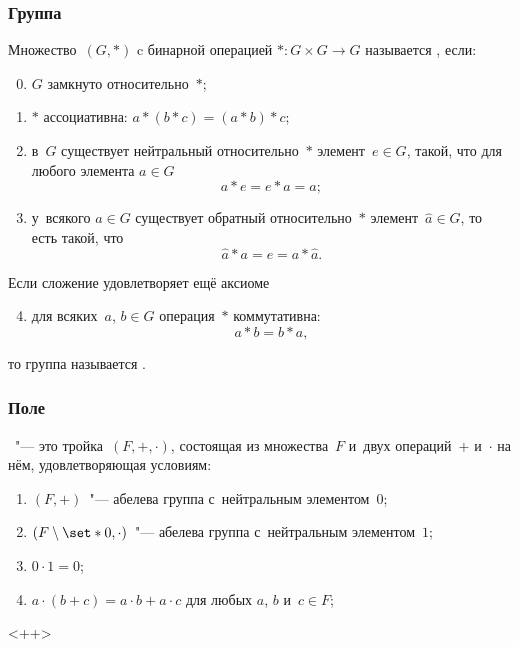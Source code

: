 \subsubsection{Группа}
\begin{definition}
	Множество~$(G, *)$ c бинарной операцией $* \colon G \times G \to G$ называется , если:
	\begin{enumerate}[1)]
		\setcounter{enumi}{-1}
		\item $G$ замкнуто относительно~$*$;
		\item $*$ ассоциативна: $a * (b * c) = (a * b) * c$;
		\item в~$G$ существует нейтральный относительно~$*$ элемент~$e \in G$, такой, что для любого элемента $a \in G$
			\[
				a * e = e * a = a
				;
			\]
		\item у~всякого $a \in G$ существует обратный относительно~$*$ элемент~$\hat{a} \in G$, то есть такой, что
			\[
				\hat{a} * a = e = a * \hat{a}
				.
			\]
	\end{enumerate}
	Если сложение удовлетворяет ещё аксиоме
	\begin{enumerate}
		\setcounter{enumi}{3}
		\item для всяких~$a$, $b \in G$ операция~$*$ коммутативна:
			\[
				a * b = b * a,
			\]
	\end{enumerate}
	то группа называется .
	\label{<+label+>}
\end{definition}

\subsubsection{Поле}

\begin{definition}
	~"--- это тройка~$(F, +, \cdot)$, состоящая из множества~$F$ и~двух
	операций~$+$ и~$\cdot$ на нём, удовлетворяющая условиям:
	\begin{enumerate}[1)]
		\item $(F, +)$~"--- абелева группа с~нейтральным элементом~$0$;
		\item $(F\setminus\set*{0}, \cdot)$~"--- абелева группа с~нейтральным элементом~$1$;
		\item $0 \cdot 1 = 0$;
		\item $a \cdot (b + c) = a\cdot b + a \cdot c$ для любых $a$, $b$ и~$c \in F$;
	\end{enumerate}

	\label{<+label+>}
\end{definition}<++>

